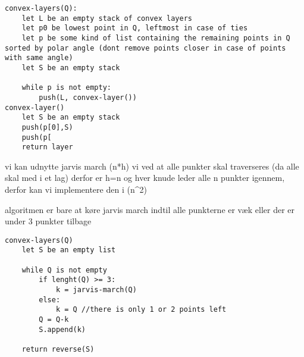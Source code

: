 


\begin{verbatim}
convex-layers(Q):
    let L be an empty stack of convex layers
    let p0 be lowest point in Q, leftmost in case of ties
    let p be some kind of list containing the remaining points in Q sorted by polar angle (dont remove points closer in case of points with same angle)
    let S be an empty stack

    while p is not empty:
        push(L, convex-layer())
convex-layer()
    let S be an empty stack
    push(p[0],S)
    push(p[
    return layer
\end{verbatim}

vi kan udnytte jarvis march \theta(n*h)
vi ved at alle punkter skal traverseres (da alle skal med i et lag) derfor er h=n
og hver knude leder alle n punkter igennem, derfor kan vi implementere den i \theta(n^2)

algoritmen er bare at køre jarvis march indtil alle punkterne er væk eller der er under 3 punkter tilbage

\begin{verbatim}
convex-layers(Q)
    let S be an empty list

    while Q is not empty
        if lenght(Q) >= 3:
            k = jarvis-march(Q)
        else:
            k = Q //there is only 1 or 2 points left
        Q = Q-k
        S.append(k)

    return reverse(S)



\end{verbatim}

